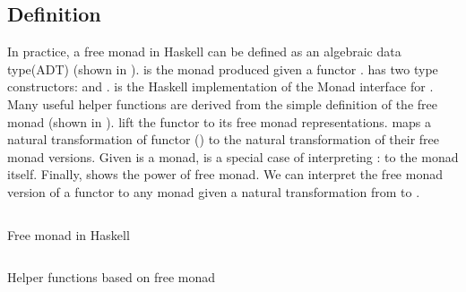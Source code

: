 \subsection{Definition}
In practice, a free monad in Haskell can be defined as an algebraic data type(ADT) (shown in ).  is the monad produced given a functor .  has two type constructors:  and .  is the Haskell implementation of the Monad interface for . Many useful helper functions are derived from the simple definition of the free monad (shown in ).  lift the functor to its free monad representations.  maps a natural transformation of functor () to the natural transformation of their free monad versions. Given  is a monad,  is a special case of interpreting : to the  monad itself. Finally,  shows the power of free monad. We can interpret the free monad version of a functor  to any monad  given a natural transformation from  to .
\begin{code}
  \inputminted{haskell}{background/fm-construction.hs}
  \caption{Free monad in Haskell}
  \label{b:fm:c1}
\end{code}
\begin{code}
  \inputminted{haskell}{background/fm-helper.hs}
  \caption{Helper functions based on free monad}
  \label{b:fm:c2}
\end{code}
